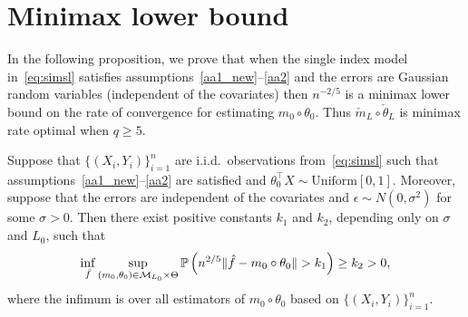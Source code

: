 \section{Minimax lower bound} %
\label{sec:minimax_lower_bound}
 In the following proposition, we prove that when the single index model in~\eqref{eq:simsl} satisfies assumptions~\ref{aa1_new}--\ref{aa2} and  the errors are Gaussian random  variables  (independent of the covariates) then  $n^{-2/5}$ is a minimax lower bound on the rate of convergence for estimating $m_0\circ\theta_0$. 
Thus  $\check{m}_{L}\circ\check{\theta}_L$ is minimax rate optimal when $q\ge 5$.

\begin{prop}\label{lem:MinimaxLowerbound}
Suppose that $\{(X_i,Y_i)\}_{i=1}^n$ are i.i.d.~observations from~\eqref{eq:simsl} such that assumptions~\ref{aa1_new}--\ref{aa2} are satisfied and $\theta_0^\top X\sim\text{Uniform}[0,1]$. Moreover, suppose that the errors are independent of the covariates and  $\epsilon \sim N(0, \sigma^2)$ for some $\sigma>0$.  Then there exist positive constants $k_1$  and $k_2$, depending only on $\sigma$ and $L_0$, such that
\begin{equation}\label{eq:Minmaxbound}
 \inf_{\hat{f}} \sup_{(m_0,\theta_0) \in \mathcal{M}_{L_0}\times \Theta} \mathbb{P}\left(n^{2/5} \|\hat{f} -m_0\circ\theta_0\|  > k_1\right) \ge k_2 >0,
\end{equation}
where the infimum is over all estimators of $m_0\circ\theta_0$ based on $\{(X_i,Y_i)\}_{i=1}^n$. 
\end{prop}
